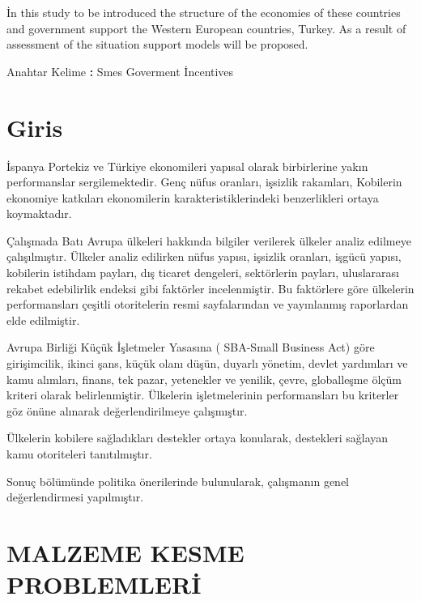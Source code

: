 \documentclass[]{book}
\newenvironment{Shaded}{\begin{snugshade}}{\end{snugshade}}
\newcommand{\NormalTok}[1]{#1}
\newcommand{\OperatorTok}[1]{\textcolor[rgb]{0.81,0.36,0.00}{\textbf{#1}}}
\begin{document}
İn this study to be introduced the structure of the economies of these countries and government support the Western European countries, Turkey. As a result of assessment of the situation support models will be proposed.

\begin{Shaded}
\begin{Highlighting}[]
\NormalTok{Anahtar Kelime }\OperatorTok{:}
\NormalTok{Smes}
\NormalTok{Goverment İncentives}
\end{Highlighting}
\end{Shaded}

\hypertarget{intro}{%
\chapter{Giris}\label{intro}}

İspanya Portekiz ve Türkiye ekonomileri yapısal olarak birbirlerine yakın performanslar sergilemektedir. Genç nüfus oranları, işsizlik rakamları, Kobilerin ekonomiye katkıları ekonomilerin karakteristiklerindeki benzerlikleri ortaya koymaktadır.

Çalışmada Batı Avrupa ülkeleri hakkında bilgiler verilerek ülkeler analiz edilmeye çalışılmıştır. Ülkeler analiz edilirken nüfus yapısı, işsizlik oranları, işgücü yapısı, kobilerin istihdam payları, dış ticaret dengeleri, sektörlerin payları, uluslararası rekabet edebilirlik endeksi gibi faktörler incelenmiştir. Bu faktörlere göre ülkelerin performansları çeşitli otoritelerin resmi sayfalarından ve yayınlanmış raporlardan elde edilmiştir.

Avrupa Birliği Küçük İşletmeler Yasasına ( SBA-Small Business Act) göre girişimcilik, ikinci şans, küçük olanı düşün, duyarlı yönetim, devlet yardımları ve kamu alımları, finans, tek pazar, yetenekler ve yenilik, çevre, globalleşme ölçüm kriteri olarak belirlenmiştir. Ülkelerin işletmelerinin performansları bu kriterler göz önüne alınarak değerlendirilmeye çalışmıştır.

Ülkelerin kobilere sağladıkları destekler ortaya konularak, destekleri sağlayan kamu otoriteleri tanıtılmıştır.

Sonuç bölümünde politika önerilerinde bulunularak, çalışmanın genel değerlendirmesi yapılmıştır.

\hypertarget{malzeme-kesme-problemleri}{%
\chapter{MALZEME KESME PROBLEMLERİ}\label{malzeme-kesme-problemleri}}
\end{document}
